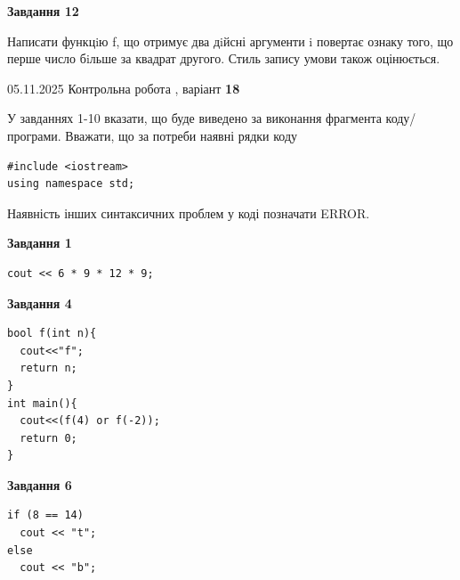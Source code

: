 \documentclass[12pt, ukrainian]{article}
\begin{document}
{\begin {large}
\begin{minipage}[t]{11.0cm}
\begin{center}
\textbf{Завдання 12}
\end{center}

Написати функцiю f, що отримує два дiйсні аргументи i повертає ознаку того, що перше число бiльше за квадрат другого. Стиль запису умови також оцінюється.\par

\end{minipage}

\end {large}}
\newpage

{\Large{05.11.2025 Контрольна робота , варіант  \No \textbf { 18 }\par}}
{
\begin {large}
У завданнях 1-10 вказати, що буде виведено за виконання фрагмента коду/про\-гра\-ми.
Вважати, що за потреби наявні рядки коду
\begin{verbatim}
#include <iostream>
using namespace std;
\end{verbatim}
Наявність інших синтаксичних проблем у коді позначати ERROR.

\begin{minipage}[t]{7.0cm}

\begin{center}
\textbf{Завдання 1}
\end{center}
\vspace{-8mm}

\begin{verbatim}
cout << 6 * 9 * 12 * 9;
\end{verbatim}



\begin{center}
\textbf{Завдання 4}
\end{center}
\vspace{-8mm}

\begin{verbatim}
bool f(int n){
  cout<<"f";
  return n;
}
int main(){
  cout<<(f(4) or f(-2));
  return 0;
}
\end{verbatim}



\begin{center}
\textbf{Завдання 6}
\end{center}
\vspace{-8mm}

\begin{verbatim}
if (8 == 14)
  cout << "t";
else
  cout << "b";
\end{verbatim}




\end{minipage}
\end{large}}
\end{document}
